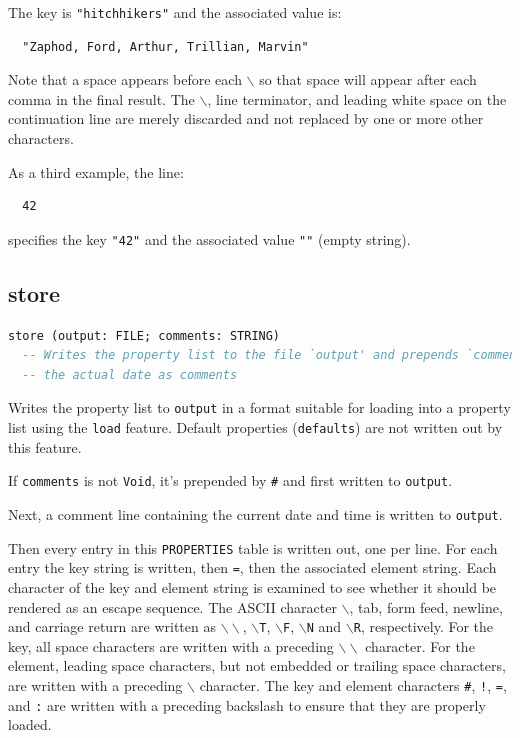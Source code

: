 \documentclass[a4paper,fleqn]{report}
\begin{document}
The key is \texttt{"hitchhikers"} and the associated value is:

\begin{lstlisting}
  "Zaphod, Ford, Arthur, Trillian, Marvin" 
\end{lstlisting}

Note that a space appears before each \texttt{$\backslash$} so that
space will appear after each comma in the final result. The
\texttt{$\backslash$}, line terminator, and leading white space on the
continuation line are merely discarded and not replaced by one or more
other characters.

As a third example, the line:

\begin{lstlisting}
  42  
\end{lstlisting}

specifies the key \texttt{"42"} and the associated value \texttt{""}
(empty string).


\subsection{store}
\label{sec:store}

\begin{lstlisting}[language=Eiffel]
store (output: FILE; comments: STRING)
  -- Writes the property list to the file `output' and prepends `comment' and
  -- the actual date as comments
\end{lstlisting}

Writes the property list to \texttt{output} in a format suitable for
loading into a property list using the \texttt{load} feature. Default
properties (\texttt{defaults}) are not written out by this feature.

If \texttt{comments} is not \texttt{Void}, it's prepended by
\texttt{\#} and first written to \texttt{output}.

Next, a comment line containing the current date and time is written
to \texttt{output}.

Then every entry in this \texttt{PROPERTIES} table is written out, one
per line. For each entry the key string is written, then \texttt{=},
then the associated element string. Each character of the key and
element string is examined to see whether it should be rendered as an
escape sequence. The ASCII character \texttt{$\backslash$}, tab, form
feed, newline, and carriage return are written as
\texttt{$\backslash\backslash$}, \texttt{$\backslash$T},
\texttt{$\backslash$F}, \texttt{$\backslash$N} and
\texttt{$\backslash$R}, respectively. For the key, all space
characters are written with a preceding
\texttt{$\backslash\backslash$} character. For the element, leading
space characters, but not embedded or trailing space characters, are
written with a preceding \texttt{$\backslash$} character. The key and
element characters \texttt{\#}, \texttt{!}, \texttt{=}, and \texttt{:}
are written with a preceding backslash to ensure that they are
properly loaded.
\end{document}
